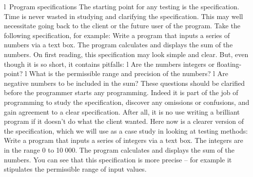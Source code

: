 l Program speciﬁcations
The starting point for any testing is the speciﬁcation. Time is never wasted in studying and clarifying the speciﬁcation. This may well necessitate going back to the client or the future user of the program. Take the following speciﬁcation, for example:
Write a program that inputs a series of numbers via a text box. The program calculates and displays the sum of the numbers.
On ﬁrst reading, this speciﬁcation may look simple and clear. But, even though it is so short, it contains pitfalls:
l	Are the numbers integers or ﬂoating-point?
l	What is the permissible range and precision of the numbers?
l	Are negative numbers to be included in the sum?
These questions should be clariﬁed before the programmer starts any programming. Indeed it is part of the job of programming to study the speciﬁcation, discover any omissions or confusions, and gain agreement to a clear speciﬁcation. After all, it is no use writing a brilliant program if it doesn’t do what the client wanted.
Here now is a clearer version of the speciﬁcation, which we will use as a case study in looking at testing methods:
Write a program that inputs a series of integers via a text box. The integers are in the range 0 to 10 000. The program calculates and displays the sum of the numbers.
You can see that this speciﬁcation is more precise – for example it stipulates the permissible range of input values.

